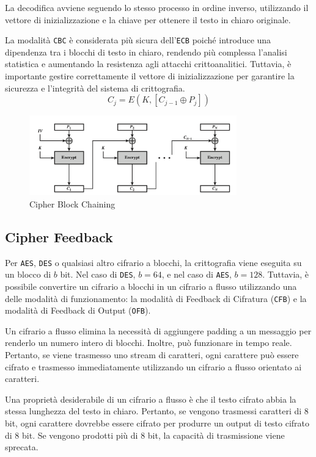 La decodifica avviene seguendo lo stesso processo in ordine inverso,
utilizzando il vettore di inizializzazione e la chiave per ottenere il
testo in chiaro originale.

La modalità \texttt{CBC} è considerata più sicura dell'\texttt{ECB} poiché
introduce una
dipendenza tra i blocchi di testo in chiaro, rendendo più complessa l'analisi
statistica e aumentando la resistenza agli attacchi crittoanalitici.
Tuttavia, è importante gestire correttamente il vettore di inizializzazione
per garantire la sicurezza e l'integrità del sistema di crittografia.
\[ C_j = E(K, [C_{j-1} \oplus P_j]) \]
\begin{figure}[H]
    \centering
    \includegraphics[width=0.8\textwidth]{img/CBC.png}
    \caption{Cipher Block Chaining}
\end{figure}
\subsection{Cipher Feedback}
Per \verb|AES|, \verb|DES| o qualsiasi altro cifrario a blocchi, la crittografia viene eseguita
su un blocco di \(b\) bit. Nel caso di \verb|DES|, \(b = 64\), e nel caso di \verb|AES|,
\(b = 128\). Tuttavia, è possibile convertire un cifrario a blocchi in un cifrario
a flusso utilizzando una delle modalità di funzionamento: la modalità di
Feedback di Cifratura (\verb|CFB|) e la modalità di Feedback di Output (\verb|OFB|).

Un cifrario a flusso elimina la necessità di aggiungere padding a un messaggio
per renderlo un numero intero di blocchi. Inoltre, può funzionare in tempo reale.
Pertanto, se viene trasmesso uno stream di caratteri, ogni carattere può essere
cifrato e trasmesso immediatamente utilizzando un cifrario a flusso orientato
ai caratteri.

Una proprietà desiderabile di un cifrario a flusso è che il testo cifrato abbia
la stessa lunghezza del testo in chiaro. Pertanto, se vengono trasmessi caratteri
di $8$ bit, ogni carattere dovrebbe essere cifrato per produrre un output di
testo cifrato di $8$ bit. Se vengono prodotti più di $8$ bit, la capacità di
trasmissione viene sprecata.


